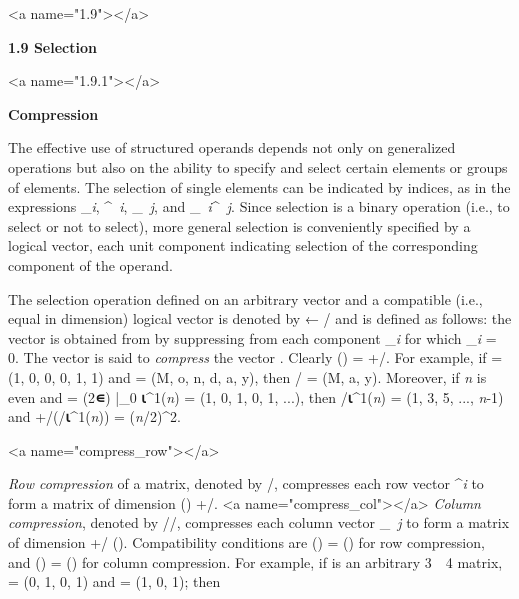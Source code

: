 <a name="1.9"></a>
\par \textbf{1.9 Selection}

<a name="1.9.1"></a>
\par \textbf{Compression}

\par The effective use of structured operands depends not only on generalized operations but also on the ability to specify and select certain elements or groups of elements. The selection of single elements can be indicated by indices, as in the expressions 
_{\textit{i}},
^{\textit{\ i}},
_{\textit{\ j}}, and
_{\textit{\ i}}^{\textit{\ j}}. Since selection is a binary operation (i.e., to select or not to select), more general selection is conveniently specified by a logical vector, each unit component indicating selection of the corresponding component of the operand.

\par The selection operation defined on an arbitrary vector  and a compatible (i.e., equal in dimension) logical vector  is denoted by
 ← / and is defined as follows: the vector  is obtained from
 by suppressing from
 each component 
_{\textit{i}} for which _{\textit{i}} = 0. The vector  is said to \textit{compress} the vector . Clearly \textit{\nu}() = +/. For example, if  = 
(1, 0, 0, 0, 1, 1) and  = (M, o, n, d, a, y), then / = (M, a, y). Moreover, if \textit{n} is even and
 = 
(2\textbf{∊}) |_{0} \textbf{⍳}^{1}(\textit{n}) = (1, 0, 1, 0, 1, ...), then /\textbf{⍳}^{1}(\textit{n}) =
(1, 3, 5, ..., \textit{n}-1) and +/(/\textbf{⍳}^{1}(\textit{n})) = (\textit{n}/2)^2.


<a name="compress_row"></a>
\par \textit{Row compression} of a matrix, denoted by /, compresses each row vector ^{\textit{i}} to form a matrix of dimension 
\textit{\mu}() \times +/.
<a name="compress_col"></a>
\textit{Column compression}, denoted by //, compresses each column vector _{\textit{\ j}} to form a matrix of dimension 
+/ \times \textit{\nu}(). Compatibility conditions are 
\textit{\nu}() = \textit{\nu}() for row compression, and 
\textit{\nu}() = \textit{\mu}() for column compression. For example, if  is an arbitrary 3\ \times\ 4 matrix,
 = (0, 1, 0, 1) and  = (1, 0, 1); then

